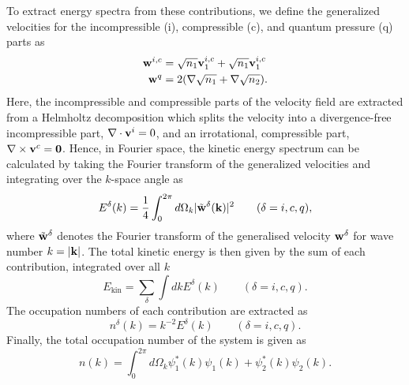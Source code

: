 To extract energy spectra from these contributions, we define the generalized
velocities for the incompressible (i), compressible (c), and quantum pressure
(q) parts as
\begin{equation}
    \begin{aligned}
        \vb{w}^{i, c} & = \sqrt{n_1}\vb{v}_1^{i, c} + \sqrt{n_1}\vb{v}_1^{i, c}
        \\
        \vb{w}^q      & = 2 (\nabla \sqrt{n_1} + \nabla \sqrt{n_2}).
    \end{aligned}
\end{equation}
Here, the incompressible and compressible parts of the velocity field are
extracted from a Helmholtz decomposition which splits the velocity into a
divergence-free incompressible part, \(\nabla \cdot \vb{v}^i = 0\), and an
irrotational, compressible part, \(\nabla \times \vb{v}^c=\vb{0}\).
Hence, in Fourier space, the kinetic energy spectrum can be calculated by
taking the Fourier transform of the generalized velocities and integrating over
the \(k\)-space angle as
\begin{equation}
    E^\delta(k) = \frac{1}{4} \int_{0}^{2\pi} d\Omega_k
    |\tilde{\vb{w}}^\delta(\vb{k})|^2
    \qquad (\delta = i, c, q),
\end{equation}
where \(\tilde{\vb{w}}^\delta \) denotes the Fourier transform of the
generalised velocity \(\vb{w}^\delta \) for wave number \(k=|\vb{k}|\).
The total kinetic energy is then given by the sum of each contribution,
integrated over all \(k\)
\begin{equation}
    E_\mathrm{kin} = \sum_\delta \int dk E^\delta (k) \qquad (\delta = i, c, q).
\end{equation}
The occupation numbers of each contribution are extracted as
\begin{equation}
    n^\delta(k) = k^{-2}E^\delta(k) \qquad (\delta = i, c, q).
\end{equation}
Finally, the total occupation number of the system is given as
\begin{equation}
    n(k) = \int_{0}^{2\pi} d\Omega_k \psi_1^*(k)\psi_1(k)
    + \psi_2^*(k)\psi_2(k).
\end{equation}

